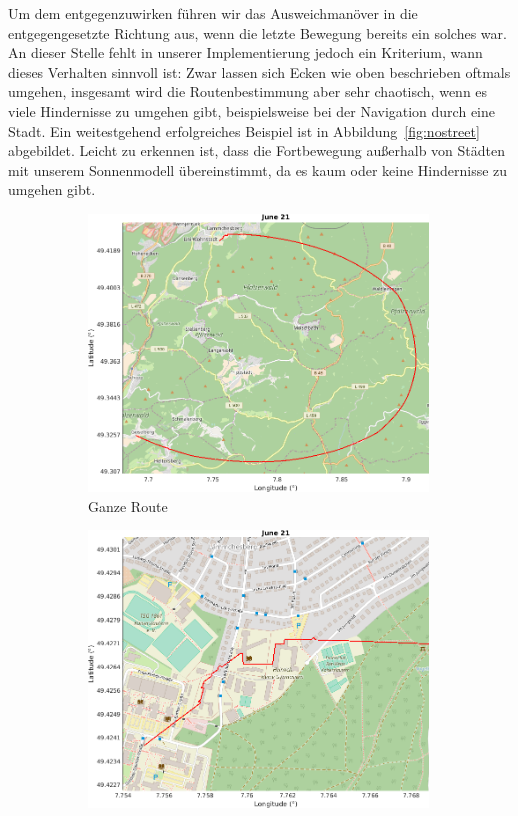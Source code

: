 \documentclass[
    paper=a4,
    DIV14,
    fontsize=12pt,
    pagesize=pdftex,
    toc=bibliographynumbered
]{scrartcl}
\numberwithin{figure}{section}
\numberwithin{equation}{section}
\numberwithin{table}{section}
\begin{document}
Um dem entgegenzuwirken führen wir das Ausweichmanöver in die entgegengesetzte Richtung
aus, wenn die letzte Bewegung bereits ein solches war. An dieser Stelle fehlt in unserer
Implementierung jedoch ein Kriterium, wann dieses Verhalten sinnvoll ist: Zwar lassen sich
Ecken wie oben beschrieben oftmals umgehen, insgesamt wird die Routenbestimmung aber sehr
chaotisch, wenn es viele Hindernisse zu umgehen gibt, beispielsweise bei der Navigation
durch eine Stadt. Ein weitestgehend erfolgreiches Beispiel ist in
Abbildung~\ref{fig:nostreet} abgebildet. Leicht zu erkennen ist, dass die Fortbewegung
außerhalb von Städten mit unserem Sonnenmodell übereinstimmt, da es kaum oder keine
Hindernisse zu
umgehen gibt.

\begin{figure}[hbt]
    \centering
    \begin{subfigure}{0.49\textwidth}
        \centering
        \includegraphics[width=0.99\textwidth]{images/nostreettukl.png}
        \caption{Ganze Route}
    \end{subfigure}
    \begin{subfigure}{0.49\textwidth}
        \centering
        \includegraphics[width=0.99\textwidth]{images/nostreettuklzoom.png}

\end{subfigure}
\end{figure}
\end{document}
